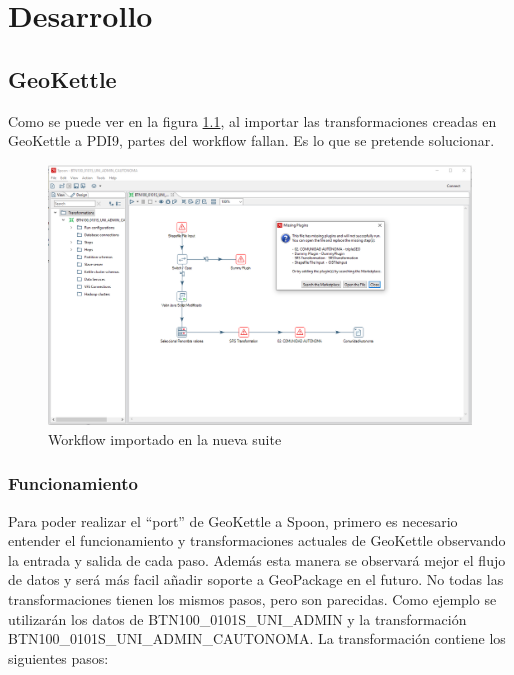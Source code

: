 \chapter{Desarrollo}

\section{GeoKettle}
Como se puede ver en la figura \ref{fig:spoon-missing-plugins}, al importar las transformaciones creadas en
GeoKettle a PDI9, partes del workflow fallan. Es lo que se pretende solucionar.

\begin{figure}[H]
    \includegraphics[width=\textwidth]{images/spoon-missing-plugins.png}
    \centering
    \caption{Workflow importado en la nueva suite}
    \label{fig:spoon-missing-plugins}
\end{figure}

\newpage
\subsection{Funcionamiento}

Para poder realizar el ``port'' de GeoKettle a Spoon, primero es necesario entender el funcionamiento y
transformaciones actuales de GeoKettle observando la entrada y salida de cada paso. Además esta manera se
observará mejor el flujo de datos y será más facil añadir soporte a GeoPackage en el futuro. No todas las
transformaciones tienen los mismos pasos, pero son parecidas. Como ejemplo se utilizarán los datos de
BTN100\_0101S\_UNI\_ADMIN y la transformación BTN100\_0101S\_UNI\_ADMIN\_CAUTONOMA. La transformación contiene
los siguientes pasos:

